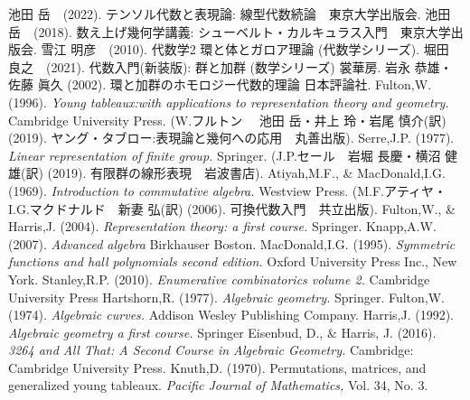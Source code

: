 \begin{thebibliography}{99}
  
   池田 岳　(2022). テンソル代数と表現論: 線型代数続論　東京大学出版会.
   池田 岳　(2018). 数え上げ幾何学講義: シューベルト・カルキュラス入門　東京大学出版会.
   雪江 明彦　(2010). 代数学2 環と体とガロア理論 (代数学シリーズ).
   堀田 良之　(2021). 代数入門(新装版): 群と加群 (数学シリーズ) 裳華房.
   岩永 恭雄・佐藤 眞久 (2002). 環と加群のホモロジー代数的理論 日本評論社.
   Fulton,W. (1996). \textit{Young tableaux:with applications to representation theory and geometry.} Cambridge University Press. (W.フルトン　 池田 岳・井上 玲・岩尾 慎介(訳) (2019). ヤング・タブロー:表現論と幾何への応用　丸善出版).
   Serre,J.P. (1977). \textit{Linear representation of finite group.} Springer. (J.P.セール　岩堀 長慶・横沼 健雄(訳) (2019). 有限群の線形表現　岩波書店).
   Atiyah,M.F., \& MacDonald,I.G. (1969). \textit{Introduction to commutative algebra.} Westview Press. (M.F.アティヤ・I.G.マクドナルド　新妻 弘(訳) (2006). 可換代数入門　共立出版).
   Fulton,W., \& Harris,J. (2004). \textit{Representation theory: a first course.} Springer. 
  Knapp,A.W. (2007). \textit{Advanced algebra} Birkhauser Boston.
   MacDonald,I.G. (1995). \textit{Symmetric functions and hall polynomials second edition.}  Oxford University Press Inc., New York.
   Stanley,R.P. (2010). \textit{Enumerative combinatorics volume 2.} Cambridge University Press
   Hartshorn,R. (1977). \textit{Algebraic geometry.} Springer.
   Fulton,W. (1974). \textit{Algebraic curves.} Addison Wesley Publishing Company. 
   Harris,J. (1992). \textit{Algebraic geometry a first course.} Springer
  Eisenbud, D., \& Harris, J. (2016). \textit{3264 and All That: A Second Course in Algebraic Geometry. }Cambridge: Cambridge University Press. 
   Knuth,D. (1970). Permutations, matrices, and generalized young tableaux. \textit{Pacific Journal of Mathematics, }Vol. 34, No. 3.
\end{thebibliography}